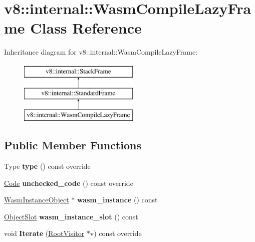 \hypertarget{classv8_1_1internal_1_1WasmCompileLazyFrame}{}\section{v8\+:\+:internal\+:\+:Wasm\+Compile\+Lazy\+Frame Class Reference}
\label{classv8_1_1internal_1_1WasmCompileLazyFrame}
Inheritance diagram for v8\+:\+:internal\+:\+:Wasm\+Compile\+Lazy\+Frame\+:\begin{figure}[H]
\begin{center}
\leavevmode
\includegraphics[height=3.000000cm]{classv8_1_1internal_1_1WasmCompileLazyFrame}
\end{center}
\end{figure}
\subsection*{Public Member Functions}
\begin{DoxyCompactItemize}
\item 
\mbox{\label{classv8_1_1internal_1_1WasmCompileLazyFrame_a13d56cfacb58a3c93b7ceaa2d9a97ee4}} 
Type {\bfseries type} () const override
\item 
\mbox{\label{classv8_1_1internal_1_1WasmCompileLazyFrame_a6b39454c5f145ba200e207661c45d666}} 
\mbox{\hyperlink{classv8_1_1internal_1_1Code}{Code}} {\bfseries unchecked\+\_\+code} () const override
\item 
\mbox{\label{classv8_1_1internal_1_1WasmCompileLazyFrame_af80a66cb4f1cc8e4dbedefb73eff0908}} 
\mbox{\hyperlink{classv8_1_1internal_1_1WasmInstanceObject}{Wasm\+Instance\+Object}} $\ast$ {\bfseries wasm\+\_\+instance} () const
\item 
\mbox{\label{classv8_1_1internal_1_1WasmCompileLazyFrame_a2f99461523de5f603dda5cc3f9289ce1}} 
\mbox{\hyperlink{classv8_1_1internal_1_1ObjectSlot}{Object\+Slot}} {\bfseries wasm\+\_\+instance\+\_\+slot} () const
\item 
\mbox{\label{classv8_1_1internal_1_1WasmCompileLazyFrame_a1f3022a1965bb049ad210639ce6ed6cc}} 
void {\bfseries Iterate} (\mbox{\hyperlink{classv8_1_1internal_1_1RootVisitor}{Root\+Visitor}} $\ast$v) const override
\end{DoxyCompactItemize}
